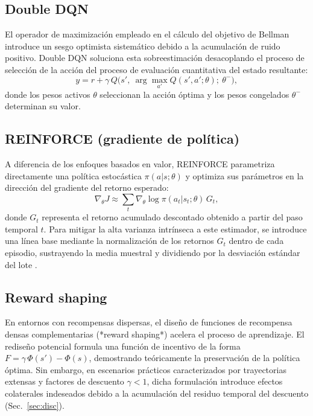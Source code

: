 \subsection{Double DQN}
El operador de maximización empleado en el cálculo del objetivo de Bellman introduce un sesgo optimista sistemático debido a la acumulación de ruido positivo. Double DQN \cite{vanhasselt2016} soluciona esta sobreestimación desacoplando el proceso de selección de la acción del proceso de evaluación cuantitativa del estado resultante:
\begin{equation}
y = r + \gamma\, Q\big(s',\ \arg\max_{a'} Q(s',a';\theta);\ \theta^-\big),
\label{eq:ddqn}
\end{equation}
donde los pesos activos $\theta$ seleccionan la acción óptima y los pesos congelados $\theta^-$ determinan su valor.

\subsection{REINFORCE (gradiente de política)}
A diferencia de los enfoques basados en valor, REINFORCE \cite{williams1992} parametriza directamente una política estocástica $\pi(a|s;\theta)$ y optimiza sus parámetros en la dirección del gradiente del retorno esperado:
\begin{equation}
\nabla_\theta J \approx \sum_t \nabla_\theta \log \pi(a_t|s_t;\theta)\, G_t,
\end{equation}
donde $G_t$ representa el retorno acumulado descontado obtenido a partir del paso temporal $t$. Para mitigar la alta varianza intrínseca a este estimador, se introduce una línea base mediante la normalización de los retornos $G_t$ dentro de cada episodio, sustrayendo la media muestral y dividiendo por la desviación estándar del lote \cite{sutton2018}.

\subsection{Reward shaping}
En entornos con recompensas dispersas, el diseño de funciones de recompensa densas complementarias (*reward shaping*) acelera el proceso de aprendizaje. El rediseño potencial \cite{ng1999} formula una función de incentivo de la forma $F = \gamma\,\Phi(s') - \Phi(s)$, demostrando teóricamente la preservación de la política óptima. Sin embargo, en escenarios prácticos caracterizados por trayectorias extensas y factores de descuento $\gamma < 1$, dicha formulación introduce efectos colaterales indeseados debido a la acumulación del residuo temporal del descuento (Sec.~\ref{sec:disc}).
